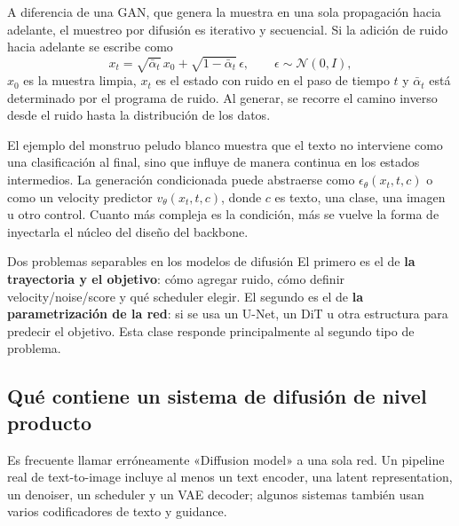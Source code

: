 
A diferencia de una GAN, que genera la muestra en una sola propagación hacia adelante, el muestreo por difusión es iterativo y secuencial. Si la adición de ruido hacia adelante se escribe como
\[
x_t=\sqrt{\bar\alpha_t}\,x_0+\sqrt{1-\bar\alpha_t}\,\epsilon,
\qquad \epsilon\sim\mathcal N(0,I),
\]
$x_0$ es la muestra limpia, $x_t$ es el estado con ruido en el paso de tiempo $t$ y $\bar\alpha_t$ está determinado por el programa de ruido. Al generar, se recorre el camino inverso desde el ruido hasta la distribución de los datos.


El ejemplo del monstruo peludo blanco muestra que el texto no interviene como una clasificación al final, sino que influye de manera continua en los estados intermedios. La generación condicionada puede abstraerse como $\epsilon_\theta(x_t,t,c)$ o como un velocity predictor $v_\theta(x_t,t,c)$, donde $c$ es texto, una clase, una imagen u otro control. Cuanto más compleja es la condición, más se vuelve la forma de inyectarla el núcleo del diseño del backbone.


\begin{importantbox}{Dos problemas separables en los modelos de difusión}
El primero es el de \textbf{la trayectoria y el objetivo}: cómo agregar ruido, cómo definir velocity/noise/score y qué scheduler elegir. El segundo es el de \textbf{la parametrización de la red}: si se usa un U-Net, un DiT u otra estructura para predecir el objetivo. Esta clase responde principalmente al segundo tipo de problema.
\end{importantbox}

\subsection{Qué contiene un sistema de difusión de nivel producto}

Es frecuente llamar erróneamente «Diffusion model» a una sola red. Un pipeline real de text-to-image incluye al menos un text encoder, una latent representation, un denoiser, un scheduler y un VAE decoder; algunos sistemas también usan varios codificadores de texto y guidance.


